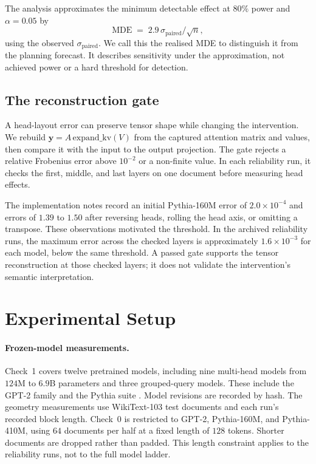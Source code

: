 \documentclass{article} %
\newcommand{\yv}{\mathbf{y}}
\begin{document}
The analysis approximates the minimum detectable effect at $80\%$ power and
$\alpha = 0.05$ by
%
\begin{equation}
\text{MDE} \;=\; 2.9\,\sigma_{\text{paired}} \big/ \sqrt{n},
\label{eq:mde}
\end{equation}
%
using the observed $\sigma_{\text{paired}}$. We call this the realised MDE
to distinguish it from the planning forecast. It describes sensitivity under
the approximation, not achieved power or a hard threshold for detection.

\subsection{The reconstruction gate}
\label{sec:gate}

A head-layout error can preserve tensor shape while changing the intervention.
We rebuild $\yv = A\,\mathrm{expand\_kv}(V)$ from the captured attention
matrix and values, then compare it with the input to the output projection.
The gate rejects a relative Frobenius error above $10^{-2}$ or a non-finite
value. In each reliability run, it checks the first, middle, and last layers
on one document before measuring head effects.

The implementation notes record an initial Pythia-160M error of
$2.0\times10^{-4}$ and errors of $1.39$ to $1.50$ after reversing heads,
rolling the head axis, or omitting a transpose. These observations motivated
the threshold. In the archived reliability runs, the maximum error across
the checked layers is approximately $1.6\times10^{-3}$ for each model,
below the same threshold. A passed gate supports the tensor reconstruction
at those checked layers; it does not validate the intervention's semantic
interpretation.

\section{Experimental Setup}

\paragraph{Frozen-model measurements.} Check~1 covers twelve pretrained
models, including nine multi-head models from $124$M to $6.9$B parameters
and three grouped-query models. These include the GPT-2
family \citep{radford2019language} and the Pythia suite
\citep{biderman2023pythia}. Model revisions are recorded by hash. The
geometry measurements use WikiText-103 test documents and each run's recorded
block length. Check~0 is restricted to GPT-2, Pythia-160M, and Pythia-410M,
using $64$ documents per half at a fixed length of $128$ tokens. Shorter
documents are dropped rather than padded. This length constraint applies to
the reliability runs, not to the full model ladder.
\end{document}
